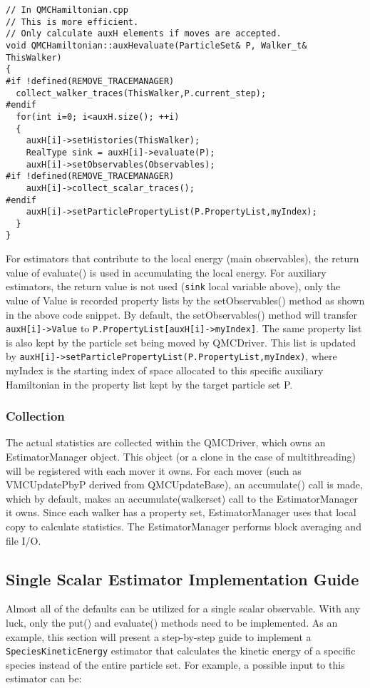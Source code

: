 \documentclass[aps,prl,preprint]{revtex4-1}
\begin{document}
\begin{lstlisting}
// In QMCHamiltonian.cpp
// This is more efficient. 
// Only calculate auxH elements if moves are accepted.
void QMCHamiltonian::auxHevaluate(ParticleSet& P, Walker_t& ThisWalker)
{
#if !defined(REMOVE_TRACEMANAGER)
  collect_walker_traces(ThisWalker,P.current_step);
#endif
  for(int i=0; i<auxH.size(); ++i)
  {
    auxH[i]->setHistories(ThisWalker);
    RealType sink = auxH[i]->evaluate(P);
    auxH[i]->setObservables(Observables);
#if !defined(REMOVE_TRACEMANAGER)
    auxH[i]->collect_scalar_traces();
#endif
    auxH[i]->setParticlePropertyList(P.PropertyList,myIndex);
  }
}
\end{lstlisting}

For estimators that contribute to the local energy (main observables), the return value of evaluate() is used in accumulating the local energy. For auxiliary estimators, the return value is not used (\verb|sink| local variable above), only the value of Value is recorded property lists by the setObservables() method as shown in the above code snippet. By default, the setObservables() method will transfer \verb|auxH[i]->Value| to \verb|P.PropertyList[auxH[i]->myIndex]|. The same property list is also kept by the particle set being moved by QMCDriver. This list is updated by \verb|auxH[i]->setParticlePropertyList(P.PropertyList,myIndex)|, where myIndex is the starting index of space allocated to this specific auxiliary Hamiltonian in the property list kept by the target particle set P.

\subsubsection{Collection}
The actual statistics are collected within the QMCDriver, which owns
an EstimatorManager object. This object (or a clone in the case of
multithreading) will be registered with each mover it owns. For each mover
(such as VMCUpdatePbyP derived from QMCUpdateBase), an accumulate() call
is made, which by default, makes an accumulate(walkerset) call to the
EstimatorManager it owns. Since each walker has a property set, EstimatorManager uses that local copy to calculate statistics. The EstimatorManager performs block averaging and file I/O.

\subsection{Single Scalar Estimator Implementation Guide}
Almost all of the defaults can be utilized for a single scalar observable. With any luck, only the put() and evaluate() methods need to be implemented. As an example, this section will present a step-by-step guide to implement a \verb|SpeciesKineticEnergy| estimator that calculates the kinetic energy of a specific species instead of the entire particle set. For example, a possible input to this estimator can be:
\end{document}
